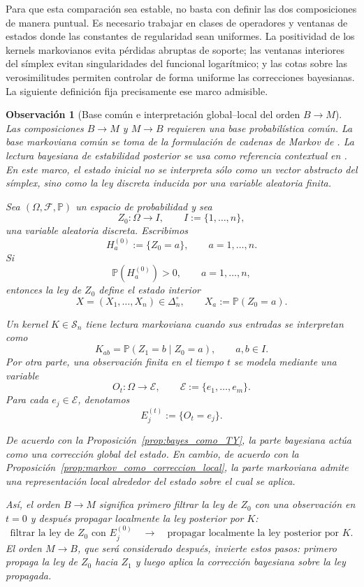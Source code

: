 \documentclass[12pt]{article}
\newtheorem{observacion}{Observación}[section]
\begin{document}
Para que esta comparación sea estable, no basta con definir las dos composiciones de manera puntual. Es necesario trabajar en clases de operadores y ventanas de estados donde las constantes de regularidad sean uniformes. La positividad de los kernels markovianos evita pérdidas abruptas de soporte; las ventanas interiores del símplex evitan singularidades del funcional logarítmico; y las cotas sobre las verosimilitudes permiten controlar de forma uniforme las correcciones bayesianas. La siguiente definición fija precisamente ese marco admisible.





\begin{observacion}[Base común e interpretación global--local del orden \(B\to M\)]
\label{obs:base_comun_global_local_BM}
Las composiciones \(B\to M\) y \(M\to B\) requieren una base probabilística común. La base markoviana común se toma de la formulación de cadenas de Markov de \citep{Norris1997}. La lectura bayesiana de estabilidad posterior se usa como referencia contextual en \citep{Sprungk2020}. En este marco, el estado inicial no se interpreta sólo como un vector abstracto del símplex, sino como la ley discreta inducida por una variable aleatoria finita.

Sea \((\Omega,\mathcal F,\mathbb P)\) un espacio de probabilidad y sea
\[
Z_0:\Omega\longrightarrow I,
\qquad
I:=\{1,\dots,n\},
\]
una variable aleatoria discreta. Escribimos
\[
H_a^{(0)}:=\{Z_0=a\},
\qquad a=1,\dots,n.
\]
Si
\[
\mathbb P(H_a^{(0)})>0,
\qquad a=1,\dots,n,
\]
entonces la ley de \(Z_0\) define el estado interior
\[
X=(X_1,\dots,X_n)\in\Delta_n^\circ,
\qquad
X_a:=\mathbb P(Z_0=a).
\]

Un kernel \(K\in\mathcal S_n\) tiene lectura markoviana cuando sus entradas se interpretan como
\[
K_{ab}
=
\mathbb P(Z_1=b\mid Z_0=a),
\qquad a,b\in I.
\]
Por otra parte, una observación finita en el tiempo \(t\) se modela mediante una variable
\[
O_t:\Omega\longrightarrow \mathcal E,
\qquad
\mathcal E:=\{e_1,\dots,e_m\}.
\]
Para cada \(e_j\in\mathcal E\), denotamos
\[
E_j^{(t)}:=\{O_t=e_j\}.
\]

De acuerdo con la Proposición~\ref{prop:bayes_como_TY}, la parte bayesiana actúa como una corrección global del estado. En cambio, de acuerdo con la Proposición~\ref{prop:markov_como_correccion_local}, la parte markoviana admite una representación local alrededor del estado sobre el cual se aplica.

Así, el orden \(B\to M\) significa primero filtrar la ley de \(Z_0\) con una observación en \(t=0\) y después propagar localmente la ley posterior por \(K\):
\[
\text{filtrar la ley de }Z_0\text{ con }E_j^{(0)}
\quad\longrightarrow\quad
\text{propagar localmente la ley posterior por }K.
\]
El orden \(M\to B\), que será considerado después, invierte estos pasos: primero propaga la ley de \(Z_0\) hacia \(Z_1\) y luego aplica la corrección bayesiana sobre la ley propagada.
\end{observacion}
\end{document}
